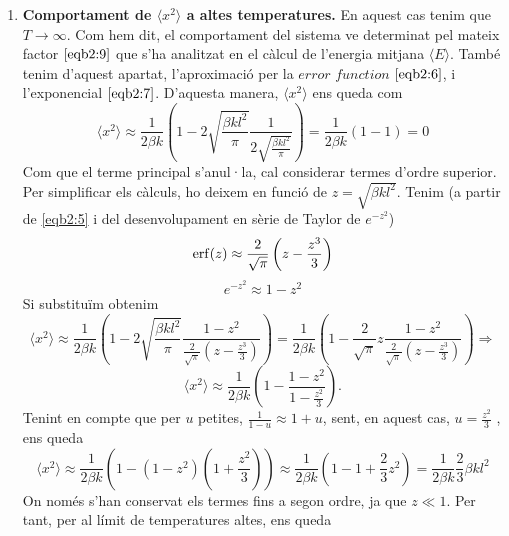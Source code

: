 \documentclass[a4paper, 10pt]{article}
\begin{document}
\begin{enumerate}
\begin{enumerate}
	\item \textbf{Comportament de $\langle x^2 \rangle$ a altes temperatures.} 
	En aquest cas tenim que $T \rightarrow \infty$. 
	Com hem dit, el comportament del sistema ve determinat pel mateix factor $\eqref{eqb2:9}$ que s'ha analitzat en el càlcul de l'energia mitjana $\langle E \rangle$. També tenim d'aquest apartat, l'aproximació per la $\textit{error function}$ $\eqref{eqb2:6}$, i l'exponencial $\eqref{eqb2:7}$. D'aquesta manera,  $\langle x^2 \rangle$ ens queda com
	\begin{equation}
		\langle x^2 \rangle \approx \frac{1}{2\beta k}\left( 1 - 2\sqrt{\frac{\beta k l^2}{\pi}}\frac{1}{2\sqrt{\frac{\beta k l^2}{\pi}}}\right) = \frac{1}{2\beta k}(1-1) = 0
	\end{equation}
	Com que el terme principal s’anul·la, cal considerar termes d’ordre superior. Per simplificar els càlculs, ho deixem en funció de $z = \sqrt{\beta k l^2} $. Tenim (a partir de \eqref{eqb2:5} i del desenvolupament en sèrie de Taylor de $e^{-z^2}$)
	\begin{equation}
		\erf(z) \approx \frac{2}{\sqrt{\pi}}\left(z - \frac{z^3}{3}\right)
	\end{equation}
	\begin{equation}
		e^{-z^2} \approx 1 - z^2
	\end{equation}
	Si substituïm obtenim
	\begin{equation*}
		\langle x^2 \rangle \approx \frac{1}{2\beta k}\left( 1 - 2\sqrt{\frac{\beta k l^2}{\pi}}\frac{1-z^2}{\frac{2}{\sqrt{\pi}}(z - \frac{z^3}{3})}\right) = \frac{1}{2\beta k}\left( 1 - \frac{2}{\sqrt{\pi}}z\frac{1-z^2}{\frac{2}{\sqrt{\pi}}(z - \frac{z^3}{3})}\right) \Rightarrow
	\end{equation*}
	\begin{equation}
		\langle x^2 \rangle \approx \frac{1}{2\beta k}\left( 1 - \frac{1-z^2}{1 - \frac{z^2}{3}}\right).
	\end{equation}
	Tenint en compte que per $u$ petites, $\frac{1}{1-u} \approx 1 + u$, sent, en aquest cas, $u = \frac{z^2}{3} $  , ens queda 
	\begin{equation}
		\langle x^2 \rangle \approx \frac{1}{2\beta k}\left( 1 - (1-z^2)(1 + \frac{z^2}{3})\right) \approx \frac{1}{2\beta k}\left( 1 - 1 + \frac{2}{3}z^2\right) = \frac{1}{2\beta k}\frac{2}{3}\beta k l^2 
	\end{equation}
	On només s’han conservat els termes fins a segon ordre, ja que $z \ll 1$. Per tant, per al límit de temperatures altes, ens queda 

\end{enumerate}
\end{enumerate}
\end{document}

